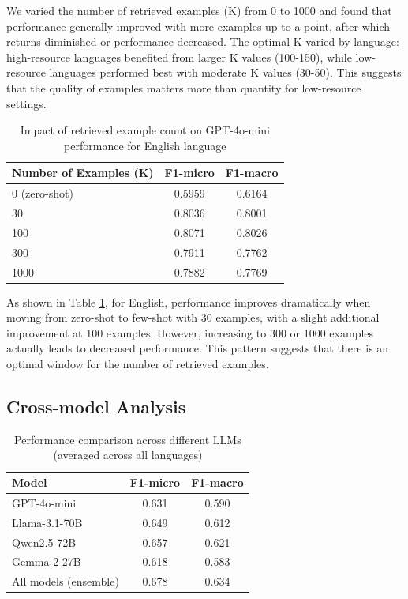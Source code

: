 \documentclass[a4paper,12pt]{extarticle}
\begin{document}
We varied the number of retrieved examples (K) from 0 to 1000 and found that performance generally improved with more examples up to a point, after which returns diminished or performance decreased. The optimal K varied by language: high-resource languages benefited from larger K values (100-150), while low-resource languages performed best with moderate K values (30-50). This suggests that the quality of examples matters more than quantity for low-resource settings.

\begin{table}[h]
\centering
\begin{tabular}{lcc}
\toprule
\textbf{Number of Examples (K)} & \textbf{F1-micro} & \textbf{F1-macro} \\
\midrule
0 (zero-shot) & 0.5959 & 0.6164 \\
30 & 0.8036 & 0.8001 \\
100 & 0.8071 & 0.8026 \\
300 & 0.7911 & 0.7762 \\
1000 & 0.7882 & 0.7769 \\
\bottomrule
\end{tabular}
\caption{Impact of retrieved example count on GPT-4o-mini performance for English language}
\label{tab:example_count}
\end{table}

As shown in Table \ref{tab:example_count}, for English, performance improves dramatically when moving from zero-shot to few-shot with 30 examples, with a slight additional improvement at 100 examples. However, increasing to 300 or 1000 examples actually leads to decreased performance. This pattern suggests that there is an optimal window for the number of retrieved examples.

\subsection{Cross-model Analysis}

\begin{table}[h]
\centering
\begin{tabular}{lcc}
\toprule
\textbf{Model} & \textbf{F1-micro} & \textbf{F1-macro} \\
\midrule
GPT-4o-mini & 0.631 & 0.590 \\
Llama-3.1-70B & 0.649 & 0.612 \\
Qwen2.5-72B & 0.657 & 0.621 \\
Gemma-2-27B & 0.618 & 0.583 \\
All models (ensemble) & 0.678 & 0.634 \\
\bottomrule
\end{tabular}
\caption{Performance comparison across different LLMs (averaged across all languages)}
\label{tab:cross_model}
\end{table}
\end{document}
